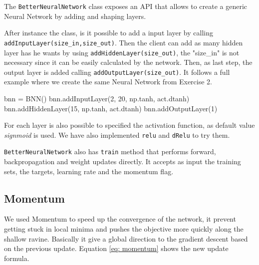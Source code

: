 \documentclass[11pt]{article}
\begin{document}
The \texttt{BetterNeuralNetwork} class exposes an API that allows to create a generic Neural Network by adding and shaping layers.

After instance the class, is it possible to add a input layer by calling \texttt{addInputLayer(size\_in,size\_out)}. Then the client can add as many hidden layer has he wants by using \texttt{addHiddenLayer(size\_out)}, the "size\_in" is not necessary since it can be easily calculated by the network. Then, as last step, the output layer is added calling \texttt{addOutputLayer(size\_out)}. It follows a full example where we create the same Neural Network from Exercise 2.
\begin{python}
   bnn = BNN()
   bnn.addInputLayer(2, 20, np.tanh, act.dtanh)
   bnn.addHiddenLayer(15, np.tanh, act.dtanh)
   bnn.addOutputLayer(1)
\end{python}

For each layer is also possible to specified the activation function, as default value \emph{signmoid} is used. We have also implemented \texttt{relu} and \texttt{dRelu} to try them.

\texttt{BetterNeuralNetwork} also has \texttt{train} method that performs forward, backpropagation and weight updates directly. It accepts as input the training sets, the targets, learning rate and the momentum flag.

\subsection{Momentum}
We used Momentum to speed up the convergence of the network, it prevent getting stuck in local minima and pushes the objective more quickly along the shallow ravine. Basically it give a global direction to the gradient descent based on the previous update. Equation \ref{eq: momentum} shows the new update formula.
\end{document}
